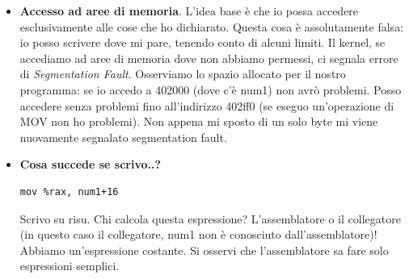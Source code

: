 \documentclass[11pt]{report}
\theoremstyle{definition}
\begin{document}
\begin{itemize}
\item \textbf{Accesso ad aree di memoria}. L'idea base è che io possa accedere esclusivamente alle cose che ho dichiarato. Questa cosa è assolutamente falsa: io posso scrivere dove mi pare, tenendo conto di alcuni limiti. Il kernel, se accediamo ad aree di memoria dove non abbiamo permessi, ci segnala errore di \emph{Segmentation Fault}. Osserviamo lo spazio allocato per il nostro programma: se io accedo a 402000 (dove c'è num1) non avrò problemi. Posso accedere senza problemi fino all'indirizzo 402ff0 (se eseguo un'operazione di MOV non ho problemi). Non appena mi sposto di un solo byte mi viene nuovamente segnalato segmentation fault.
\item \textbf{Cosa succede se scrivo..?}
\begin{verbatim}
mov %rax, num1+16
\end{verbatim}
Scrivo su risu. Chi calcola questa espressione? L'assemblatore o il collegatore (in questo caso il collegatore, num1 non è conosciuto dall'assemblatore)! Abbiamo un'espressione costante.
Si osservi che l'assemblatore sa fare solo espressioni semplici.
\end{itemize}
\end{document}
